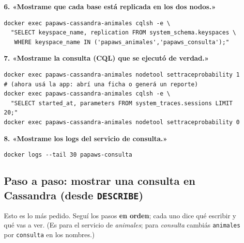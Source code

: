 \documentclass[11pt,a4paper]{article}
\begin{document}
\medskip
\noindent\textbf{6. «Mostrame que cada base está replicada en los dos nodos.»}
\begin{lstlisting}[style=shell]
docker exec papaws-cassandra-animales cqlsh -e \
  "SELECT keyspace_name, replication FROM system_schema.keyspaces \
   WHERE keyspace_name IN ('papaws_animales','papaws_consulta');"
\end{lstlisting}

\medskip
\noindent\textbf{7. «Mostrame la consulta (CQL) que se ejecutó de verdad.»}
\begin{lstlisting}[style=shell]
docker exec papaws-cassandra-animales nodetool settraceprobability 1
# (ahora usá la app: abrí una ficha o generá un reporte)
docker exec papaws-cassandra-animales cqlsh -e \
  "SELECT started_at, parameters FROM system_traces.sessions LIMIT 20;"
docker exec papaws-cassandra-animales nodetool settraceprobability 0
\end{lstlisting}

\medskip
\noindent\textbf{8. «Mostrame los logs del servicio de consulta.»}
\begin{lstlisting}[style=shell]
docker logs --tail 30 papaws-consulta
\end{lstlisting}

\subsection{Paso a paso: mostrar una consulta en Cassandra (desde \texttt{DESCRIBE})}
Esto es lo más pedido. Seguí los pasos \textbf{en orden}; cada uno dice qué escribir y
qué vas a ver. (Es para el servicio de \emph{animales}; para \emph{consulta} cambiás
\texttt{animales} por \texttt{consulta} en los nombres.)
\end{document}
